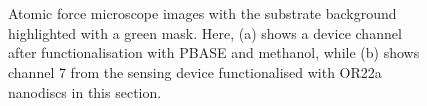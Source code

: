 \documentclass[
  a4paper,
]{scrbook}
\begin{document}
\begin{figure}
\begin{minipage}[t]{0.03\linewidth}
{\centering 


}

\end{minipage}%
%
\begin{minipage}[t]{0.01\linewidth}

{\centering 

~

}

\end{minipage}%
%
\begin{minipage}[t]{0.45\linewidth}

{\centering 


}

\end{minipage}%
%
\begin{minipage}[t]{0.01\linewidth}

{\centering 

~

}

\end{minipage}%

\caption{\label{fig-working-OR22a-masks}Atomic force microscope images
with the substrate background highlighted with a green mask. Here, (a)
shows a device channel after functionalisation with PBASE and methanol,
while (b) shows channel 7 from the sensing device functionalised with
OR22a nanodiscs in this section.}

\end{figure}
\end{document}
